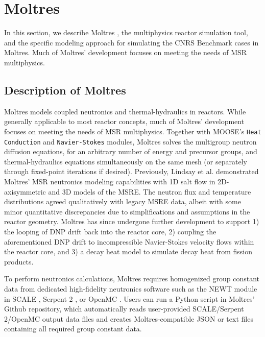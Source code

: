 \section{Moltres} \label{sec:moltres}

In this section, we describe Moltres \cite{lindsay_introduction_2018}, the
multiphysics reactor simulation tool, and the specific modeling approach for
simulating the CNRS Benchmark cases in Moltres. Much of Moltres' development
focuses on meeting the needs of \gls{MSR} multiphysics.

\subsection{Description of Moltres} \label{sec:description-of-moltres}

Moltres models coupled neutronics and thermal-hydraulics in reactors. While
generally applicable to most reactor concepts, much of
Moltres' development focuses on meeting the needs of \gls{MSR} multiphysics.
Together with \gls{MOOSE}'s \cite{permann_moose_2020} \texttt{Heat}
\texttt{Conduction} and \texttt{Navier-Stokes} \cite{peterson_overview_2018}
modules, Moltres solves the multigroup neutron diffusion
equations, for an arbitrary number of energy and precursor groups, and
thermal-hydraulics equations simultaneously on the same mesh (or separately
through fixed-point iterations if desired).
Previously, Lindsay et al. \cite{lindsay_introduction_2018}
demonstrated Moltres' \gls{MSR} neutronics modeling capabilities with 1D salt
flow in 2D-axisymmetric and 3D models of the \gls{MSRE}. The neutron flux and
temperature distributions agreed qualitatively with legacy
\gls{MSRE} data, albeit with some minor quantitative discrepancies due to
simplifications and assumptions in the reactor geometry. Moltres has
since undergone further development to support 1) the looping of \gls{DNP}
drift back into the reactor core, 2) coupling the aforementioned \gls{DNP}
drift to incompressible Navier-Stokes velocity flows within the reactor core,
and 3) a decay heat model to simulate decay heat from fission products.

To perform neutronics calculations, Moltres requires homogenized group constant
data from dedicated high-fidelity neutronics software such as the NEWT module
in SCALE \cite{dehart_reactor_2011}, Serpent 2 \cite{leppanen_serpent_2014}, or
OpenMC \cite{romano_openmc:_2015}. Users can run a Python script in Moltres'
Github repository, which automatically reads
user-provided SCALE/Serpent 2/OpenMC output data files and creates
Moltres-compatible JSON or text files containing all required group constant
data.

